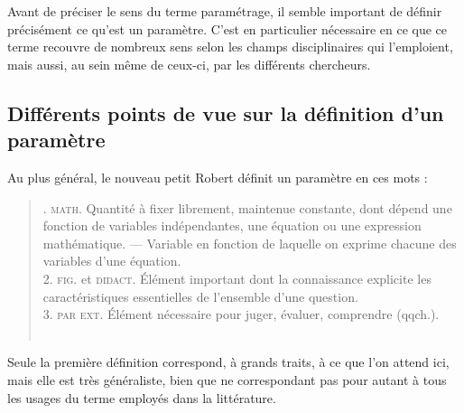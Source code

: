 Avant de préciser le sens du terme \og paramétrage\fg{}, il semble important de définir précisément ce qu'est un paramètre. C'est en particulier nécessaire en ce que ce terme recouvre de nombreux sens selon les champs disciplinaires qui l'emploient, mais aussi, au sein même de ceux-ci, par les différents chercheurs.

\subsection{Différents points de vue sur la définition d'un paramètre}

Au plus général, le nouveau petit Robert définit un paramètre en ces mots :
\begin{quote}
	. \textsc{math.} Quantité à fixer librement, maintenue constante, dont dépend une fonction de variables indépendantes, une équation ou une expression mathématique. --- Variable en fonction de laquelle on exprime chacune des variables d'une équation.\\
	2. \textsc{fig.} et \textsc{didact.} Élément important dont la connaissance explicite les caractéristiques essentielles de l'ensemble d'une question.\\
	3. \textsc{par ext.} Élément nécessaire pour juger, évaluer, comprendre (qqch.).\fg{}\\
	\mbox{}~ \hfill \autocite[\textbf{Paramètre}]{robert_nouveau_1993}
\end{quote}


Seule la première définition correspond, à grands traits, à ce que l'on attend ici, mais elle est très généraliste, bien que ne correspondant pas pour autant à tous les usages du terme employés dans la littérature.

